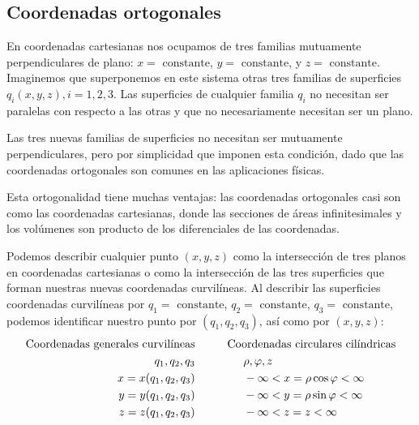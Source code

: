 \subsection{Coordenadas ortogonales}
En coordenadas cartesianas nos ocupamos de tres familias mutuamente perpendiculares de plano: $x = \mbox{ constante}$, $y = \mbox{ constante}$, y $z = \mbox{ constante}$. Imaginemos que superponemos en este sistema otras tres familias de superficies $q_{i} (x, y, z), i = 1, 2, 3$. Las superficies de cualquier familia $q_{i}$ no necesitan ser paralelas con respecto a las otras  y que no necesariamente necesitan ser un plano.
\par
Las tres nuevas familias de superficies no necesitan ser mutuamente perpendiculares, pero por simplicidad que imponen esta condición, dado que las coordenadas ortogonales son comunes en las aplicaciones físicas.
\par
Esta ortogonalidad tiene muchas ventajas: las coordenadas ortogonales casi son como las coordenadas cartesianas, donde las secciones de áreas infinitesimales y los volúmenes son producto de los diferenciales de las coordenadas.
\par
Podemos describir cualquier punto $(x, y, z)$ como la intersección de tres planos en coordenadas cartesianas o como la intersección de las tres superficies que forman nuestras nuevas coordenadas curvilíneas. Al describir las superficies coordenadas curvilíneas por $q_{1} = \mbox{ constante}$, $q_{2} = \mbox{ constante}$, $q_{3} = \mbox{ constante}$, podemos identificar nuestro punto por $(q_{1}, q_{2}, q_{3})$, así como por $(x, y, z)$:
\begin{eqnarray}
\begin{aligned}
\mbox{Coordenadas  generales curvilíneas} & \hspace{1.cm} \mbox{Coordenadas circulares cilíndricas} \\
q_{1}, q_{2}, q_{3} & \hspace{1.5cm} \rho, \varphi, z \\ 
x = x(q_{1},q_{2}, q_{3}) & \hspace{1.5cm} - \infty < x = \rho \cos \varphi < \infty \\ 
y = y(q_{1},q_{2}, q_{3}) & \hspace{1.5cm} - \infty < y = \rho \sin \varphi < \infty \\
z = z(q_{1},q_{2}, q_{3}) & \hspace{1.5cm} - \infty < z = z < \infty
\label{eq:ecuacion_02_01}
\end{aligned}
\end{eqnarray}

